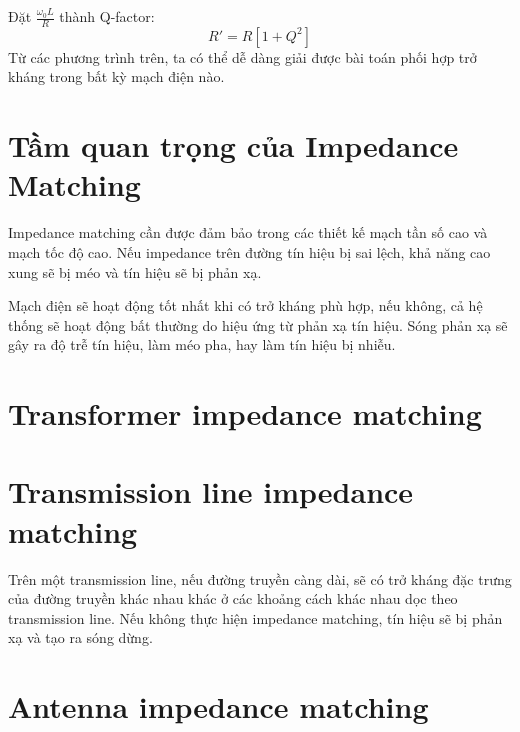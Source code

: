         Đặt $\frac{\omega_0 L}{R}$ thành Q-factor:
        \begin{equation}
            R' = R\left[1 + Q^2\right]
        \end{equation}
        Từ các phương trình trên, ta có thể dễ dàng giải được bài toán phối hợp trở kháng trong bất kỳ mạch điện nào.\cite{allaboutcircuits_impedance}

    \section{Tầm quan trọng của Impedance Matching}
        Impedance matching cần được đảm bảo trong các thiết kế mạch tần số cao
        và mạch tốc độ cao. Nếu impedance trên đường tín hiệu bị sai lệch,
        khả năng cao xung sẽ bị méo và tín hiệu sẽ bị phản xạ.\par
        Mạch điện sẽ hoạt động tốt nhất khi có trở kháng phù hợp, nếu không, cả hệ thống sẽ hoạt động bất thường do hiệu ứng từ phản xạ tín hiệu.
        Sóng phản xạ sẽ gây ra độ trễ tín hiệu, làm méo pha, hay làm tín hiệu bị nhiễu.
        
    \section{Transformer impedance matching}

    \section{Transmission line impedance matching}
        Trên một transmission line, nếu đường truyền càng dài,
        sẽ có trở kháng đặc trưng của đường truyền khác nhau khác
        ở các khoảng cách khác nhau dọc theo transmission line.
        Nếu không thực hiện impedance matching, tín hiệu sẽ bị phản xạ
        và tạo ra sóng dừng.

    \section{Antenna impedance matching}

